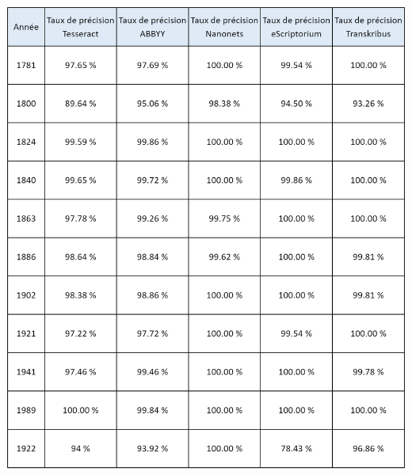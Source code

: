 \documentclass[a4paper,12pt,twoside]{book}
\begin{document}
\includegraphics[width=6in,height=7.25in]{vertopal_157ae480aa4a4b07be198b586a812241/media/image24.png}

\newpage{\pagestyle{empty}\cleardoublepage}


\backmatter %

\listoftables
\listoffigures
\tableofcontents
\end{document}
